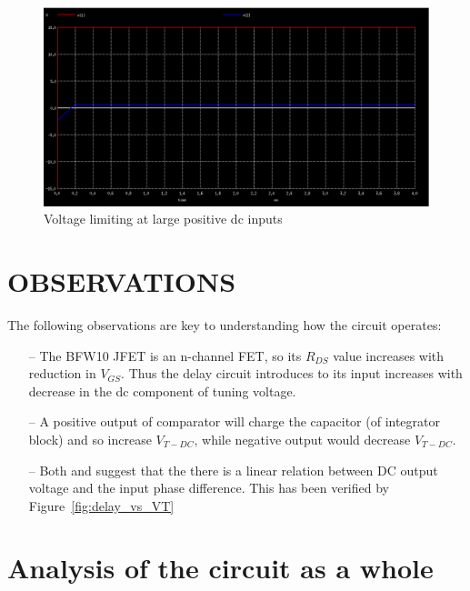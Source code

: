 \documentclass[]{risa}
\begin{document}
\begin{figure}[bhp]
\centering
\includegraphics[width=\columnwidth]{int_Positive.PNG}
\caption{Voltage limiting at large positive dc inputs}
\label{int_pos}
\end{figure}


\section{OBSERVATIONS}
The following observations are key to understanding how the circuit operates:
\begin{itemize}
    \item [--] The BFW10 JFET is an n-channel FET, so its $R_{DS}$ value increases with reduction in $V_{GS}$. Thus the delay circuit introduces to its input increases with decrease in the dc component of tuning voltage.
    \item [--] A positive output of comparator will charge the capacitor (of integrator block) and so increase $V_{T-DC}$, while negative output would decrease $V_{T-DC}$.
    \item [--] Both \cite{1031521} and  \cite{541607} suggest that the there is a linear relation between DC output voltage and the input phase difference. This has been verified by Figure~\ref{fig:delay_vs_VT}
\end{itemize}

\section{Analysis of the circuit as a whole}
\end{document}
